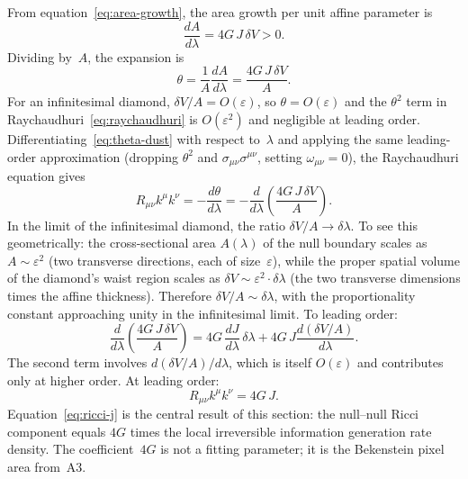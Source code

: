 \documentclass[12pt]{article}
\begin{document}
From equation~\eqref{eq:area-growth}, the area growth per
unit affine parameter is
\begin{equation}
  \frac{dA}{d\lambda} = 4G\,J\,\delta V > 0.
  \label{eq:dA-dlambda}
\end{equation}
Dividing by~$A$, the expansion is
\begin{equation}
  \theta = \frac{1}{A}\frac{dA}{d\lambda}
         = \frac{4G\,J\,\delta V}{A}.
  \label{eq:theta-dust}
\end{equation}
For an infinitesimal diamond, $\delta V/A = O(\varepsilon)$, so
$\theta = O(\varepsilon)$ and the $\theta^2$ term in
Raychaudhuri~\eqref{eq:raychaudhuri} is $O(\varepsilon^2)$
and negligible at leading order.
Differentiating~\eqref{eq:theta-dust} with respect to~$\lambda$
and applying the same leading-order approximation
(dropping $\theta^2$ and $\sigma_{\mu\nu}\sigma^{\mu\nu}$,
setting $\omega_{\mu\nu}=0$), the Raychaudhuri equation gives
\begin{equation}
  R_{\mu\nu}k^\mu k^\nu
  = -\frac{d\theta}{d\lambda}
  = -\frac{d}{d\lambda}\!\left(\frac{4G\,J\,\delta V}{A}\right).
  \label{eq:ricci-intermediate}
\end{equation}
In the limit of the infinitesimal diamond, the ratio
$\delta V / A \to \delta\lambda$.
To see this geometrically: the cross-sectional area $A(\lambda)$
of the null boundary scales as $A \sim \varepsilon^2$ (two transverse
directions, each of size~$\varepsilon$), while the proper spatial
volume of the diamond's waist region scales as
$\delta V \sim \varepsilon^2 \cdot \delta\lambda$ (the two transverse
dimensions times the affine thickness).
Therefore $\delta V / A \sim \delta\lambda$, with the proportionality
constant approaching unity in the infinitesimal limit.
To leading order:
\begin{equation}
  \frac{d}{d\lambda}\!\left(\frac{4G\,J\,\delta V}{A}\right)
  = 4G\,\frac{dJ}{d\lambda}\,\delta\lambda
  + 4G\,J\frac{d(\delta V/A)}{d\lambda}.
\end{equation}
The second term involves $d(\delta V/A)/d\lambda$, which
is itself $O(\varepsilon)$ and contributes only at higher order.
At leading order:
\begin{equation}
  R_{\mu\nu}k^\mu k^\nu
  = 4G\,J.
  \label{eq:ricci-j}
\end{equation}
Equation~\eqref{eq:ricci-j} is the central result of this section:
the null--null Ricci component equals $4G$ times the local
irreversible information generation rate density.
The coefficient~$4G$ is not a fitting parameter; it is the
Bekenstein pixel area from~A3.
\end{document}
